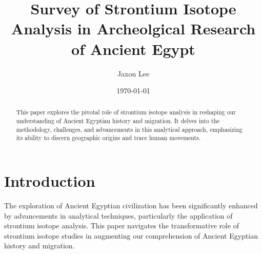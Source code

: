 \documentclass[a4paper, 12pt]{article}
\title{Survey of Strontium Isotope Analysis in Archeolgical Research of Ancient Egypt}
\author{Jaxon Lee}
\date{\today}
\begin{document}
\maketitle

\begin{abstract}
    This paper explores the pivotal role of strontium isotope analysis in reshaping our understanding of Ancient Egyptian history and migration. It delves into the methodology, challenges, and advancements in this analytical approach, emphasizing its ability to discern geographic origins and trace human movements.
\end{abstract}

\section{Introduction}



The exploration of Ancient Egyptian civilization has been significantly enhanced by
advancements in analytical techniques, particularly the application of strontium
isotope analysis. This paper navigates the transformative role of strontium isotope
studies in augmenting our comprehension of Ancient Egyptian history and migration.
\end{document}
